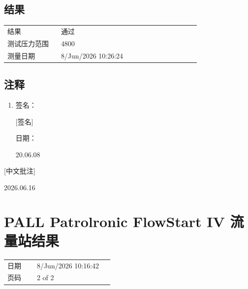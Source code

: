 \documentclass[UTF8,10pt,a4paper,fontset=fandol]{ctexart}
\newcommand{\fieldvalue}[1]{#1}
\newcommand{\handwritten}[1]{#1}
\begin{document}
\vspace{1em}

\subsection*{结果}

\begin{tabular}{@{}p{0.25\linewidth}p{0.65\linewidth}@{}}
结果 &
\fieldvalue{通过} \\
测试压力范围 &
\fieldvalue{4800\ \mathrm{mbar}} \\
测量日期 &
\fieldvalue{8/Jun/2026 10:26:24} \\
\end{tabular}

\vspace{1em}

\subsection*{注释}

\begin{enumerate}
\item 签名：

\fieldvalue{\handwritten{[签名]}}

日期：

\fieldvalue{\handwritten{20.06.08}}
\end{enumerate}

\handwritten{[中文批注]}

\handwritten{2026.06.16}

\newpage

\section*{PALL Patrolronic FlowStart IV 流量站结果}

\begin{tabular}{@{}p{0.25\linewidth}p{0.65\linewidth}@{}}
日期 &
\fieldvalue{8/Jun/2026 10:16:42} \\
页码 &
\fieldvalue{2 of 2} \\
\end{tabular}
\end{document}

